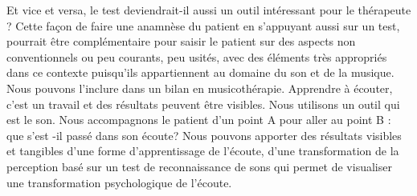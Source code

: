 Et vice et versa, le test deviendrait-il aussi un outil intéressant pour le thérapeute ?
Cette façon de faire une anamnèse du patient en s'appuyant aussi sur un test, pourrait être complémentaire pour saisir le patient sur des aspects non conventionnels ou peu courants, peu usités, avec des éléments très appropriés dans ce contexte puisqu'ils appartiennent au domaine du son et de la musique. 
Nous pouvons  l'inclure dans un  bilan en musicothérapie. Apprendre à écouter, c'est un travail et des résultats peuvent être
visibles. Nous utilisons un outil qui est le son. Nous accompagnons
le patient d'un point A pour aller au point B : que s'est -il passé
dans son écoute? Nous pouvons apporter des résultats visibles et tangibles 
d'une forme d'apprentissage de l'écoute, d'une transformation de la
perception basé sur un test de reconnaissance de sons qui permet de visualiser une transformation psychologique
de l'écoute. 

